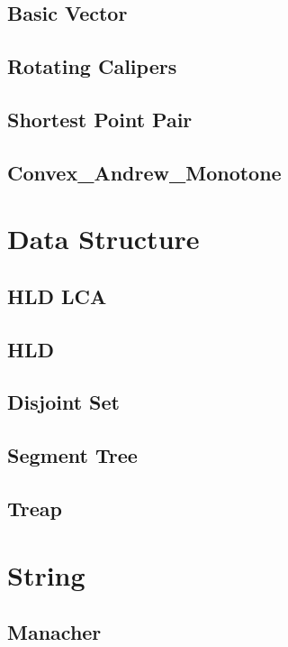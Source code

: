 	\subsection{Basic Vector}
		
	\subsection{Rotating Calipers}
		
	\subsection{Shortest Point Pair}
		
	\subsection{Convex\_Andrew\_Monotone}
		
\section{Data Structure}
	\subsection{HLD LCA}
		
	\subsection{HLD}
		
	\subsection{Disjoint Set}
		
	\subsection{Segment Tree}
		
	\subsection{Treap}
		
\section{String}
	\subsection{Manacher}
		
